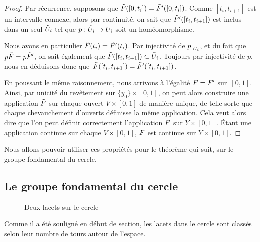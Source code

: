 \begin{proof}
Par récurrence, supposons que $\Tilde{F}([0,t_i])=\Tilde{F}'([0,t_i])$. Comme $[t_i,t_{i+1}]$ est un intervalle connexe, alors par continuité, on sait que $\Tilde{F}'([t_i,t_{i+1}])$ est inclus dans un seul $\Tilde{U}_i$ tel que $p:\Tilde{U}_i\to U_i$ soit un homéomorphisme.

Nous avons en particulier $\Tilde{F}(t_i)=\Tilde{F}'(t_i)$. Par injectivité de $p|_{\Tilde{U}_i}$, et du fait que $p\Tilde{F}=p\Tilde{F}'$, on sait également que $\Tilde{F}([t_i,t_{i+1}])\subset\Tilde{U}_i$. Toujours par injectivité de $p$, nous en déduisons donc que~$\Tilde{F}([t_i,t_{i+1}])=\Tilde{F}'([t_i,t_{i+1}])$.

\bigskip En poussant le même raisonnement, nous arrivons à l'égalité $\Tilde{F}=\Tilde{F}'$ sur~$[0,1]$. Ainsi, par unicité du revêtement sur $\{y_0\}\times[0,1]$, on peut alors construire une application $\Tilde{F}$ sur chaque ouvert $V\times[0,1]$ de manière unique, de telle sorte que chaque chevauchement d'ouverts définisse la même application. Cela veut alors dire que l'on peut définir correctement l'application $\Tilde{F}$ sur $Y\times[0,1]$. Étant une application continue sur chaque $V\times[0,1]$, $\Tilde{F}$ est continue sur $Y\times[0,1]$.
\end{proof}

Nous allons pouvoir utiliser ces propriétés pour le théorème qui suit, sur le groupe fondamental du cercle.

\subsection{Le groupe fondamental du cercle}

\begin{figure}
    \centering
    \caption{Deux lacets sur le cercle}
    \label{fig:loops-circle}
\end{figure}

Comme il a été souligné en début de section, les lacets dans le cercle sont classés selon leur nombre de tours autour de l'espace.

